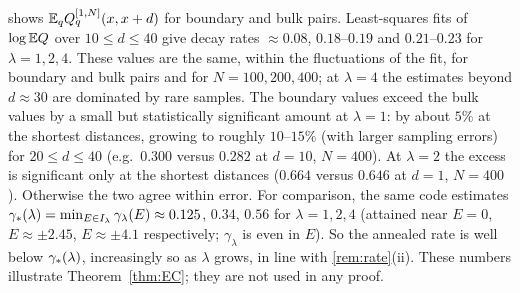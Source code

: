 \begin{remark}\label{rem:onebodynumerics}
 shows $\mathbb{E}_qQ^{[1,N]}_q(x,x+d)$ for boundary and bulk pairs.  Least-squares fits of
$\log\mathbb{E} Q$ over $10\le d\le40$ give decay rates $\approx0.08$, $0.18$--$0.19$ and $0.21$--$0.23$ for
$\lambda=1,2,4$.  These values are the same, within the fluctuations of the fit, for boundary and bulk
pairs and for $N=100,200,400$; at $\lambda=4$ the estimates beyond $d\approx30$ are dominated by rare
samples.  The boundary values exceed the bulk values by a small but statistically significant amount at
$\lambda=1$: by about $5\%$ at the shortest distances, growing to roughly $10$--$15\%$ (with larger
sampling errors) for $20\le d\le40$ (e.g.\ $0.300$ versus $0.282$ at $d=10$, $N=400$).  At $\lambda=2$ the
excess is significant only at the shortest distances ($0.664$ versus $0.646$ at $d=1$, $N=400$).
Otherwise the two agree within error.  For
comparison, the same code estimates $\gamma_*(\lambda)=\min_{E\in I_\lambda}\gamma_\lambda(E)\approx0.125$, $0.34$,
$0.56$ for $\lambda=1,2,4$ (attained near $E=0$, $E\approx\pm2.45$, $E\approx\pm4.1$ respectively; $\gamma_\lambda$
is even in $E$).  So the annealed
rate is well below $\gamma_*(\lambda)$, increasingly so as $\lambda$ grows, in line with \cref{rem:rate}(ii).
These numbers illustrate Theorem~\ref{thm:EC}; they are not used in any proof.
\end{remark}
